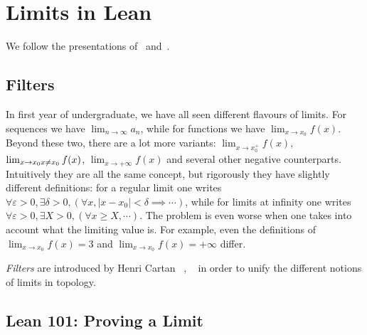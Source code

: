 \section{Limits in Lean}

We follow the presentations of~\cite{HIH2013} and~\cite{BCM2020}.

\subsection{Filters}


In first year of undergraduate, we have all seen different flavours of limits. For sequences we have \(\lim_{n \to \infty} a_n\), while for functions we have \(\lim_{x \to x_0} f(x)\). Beyond these two, there are a lot more variants: \(\lim_{x \to x_0^+} f(x)\), \(\lim_{x \to x_0 \\ x \neq x_0} f(x)\), \(\lim_{x \to +\infty} f(x)\) and several other negative counterparts. Intuitively they are all the same concept, but rigorously they have slightly different definitions: for a regular limit one writes \(\forall \varepsilon > 0, \exists \delta > 0, (\forall x, |x - x_0| < \delta \implies \cdots)\), while for limits at infinity one writes \(\forall \varepsilon > 0, \exists X > 0, (\forall x \geq X, \cdots)\). The problem is even worse when one takes into account what the limiting value is. For example, even the definitions of \(\lim_{x \to x_0} f(x) = 3\) and \(\lim_{x \to x_0} f(x) = +\infty\) differ.

\textit{Filters} are introduced by Henri Cartan ~\cite{Cartan1937a}, ~\cite{Cartan1937b} in order to unify the different notions of limits in topology. 

\subsection{Lean 101: Proving a Limit}

